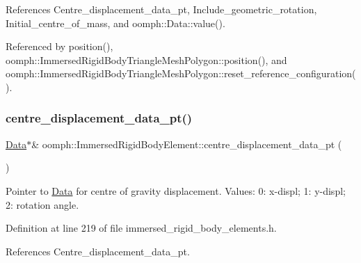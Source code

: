 References Centre\+\_\+displacement\+\_\+data\+\_\+pt, Include\+\_\+geometric\+\_\+rotation, Initial\+\_\+centre\+\_\+of\+\_\+mass, and oomph\+::\+Data\+::value().



Referenced by position(), oomph\+::\+Immersed\+Rigid\+Body\+Triangle\+Mesh\+Polygon\+::position(), and oomph\+::\+Immersed\+Rigid\+Body\+Triangle\+Mesh\+Polygon\+::reset\+\_\+reference\+\_\+configuration().

\mbox{\label{classoomph_1_1ImmersedRigidBodyElement_ac1e912d596869720566ab2264aa60d6c}} 
\subsubsection{\texorpdfstring{centre\+\_\+displacement\+\_\+data\+\_\+pt()}{centre\_displacement\_data\_pt()}}
{\footnotesize\ttfamily \hyperlink{classoomph_1_1Data}{Data}$\ast$\& oomph\+::\+Immersed\+Rigid\+Body\+Element\+::centre\+\_\+displacement\+\_\+data\+\_\+pt (\begin{DoxyParamCaption}{ }\end{DoxyParamCaption})\hspace{0.3cm}{\ttfamily [inline]}}



Pointer to \hyperlink{classoomph_1_1Data}{Data} for centre of gravity displacement. Values\+: 0\+: x-\/displ; 1\+: y-\/displ; 2\+: rotation angle. 



Definition at line 219 of file immersed\+\_\+rigid\+\_\+body\+\_\+elements.\+h.



References Centre\+\_\+displacement\+\_\+data\+\_\+pt.

\mbox{\label{classoomph_1_1ImmersedRigidBodyElement_aae4212a06293e06c0d8ccf2ce57a466f}} 

